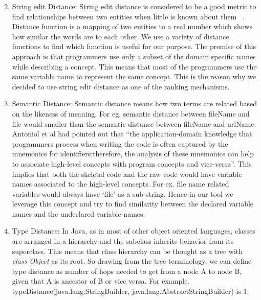 \begin{enumerate}
\setcounter{enumi}{1}
\item String edit Distance: String edit distance is considered to be a good metric to find relationships between two entities when little is known about them ~\cite{cohen2003comparison}. Distance function is a mapping of two entities to a real number which shows how similar the words are to each other. We use a variety of distance functions to find which function is useful for our purpose. The premise of this approach is that programmers use only a subset of the domain specific names while describing a concept. This means that most of the programmers use the same variable name to represent the same concept. This is the reason why we decided to use string edit distance as one of the ranking mechanisms.
\item Semantic Distance:  Semantic distance means how two terms are related based on the likeness of meaning. For eg. semantic distance between fileName and file would smaller than the semantic distance between fileName and urlName.  Antoniol et al had pointed out that ``the application-domain knowledge that programmers process when writing the code is often captured by the mnemonics for identifiers;therefore, the analysis of these mnemonics can help to associate high-level concepts with program concepts and vice-versa''. This implies that both the skeletal code and the raw code would have variable names associated to the high-level concepts. For ex. file name related variables would always have `file' as a sub-string. Hence in our tool we leverage this concept and try to find similarity between the declared variable names and the undeclared variable names. 

\item Type Distance:  In Java, as in most of other object oriented languages, classes are arranged in a hierarchy and the subclass inherits behavior from its superclass. This means that class hierarchy can be thought as a tree with \textit{class Object} as its root. So drawing from the tree terminology, we can define type distance as number of hops needed to get from a node A to node B, given that A is ancestor of B or vice versa. For example. typeDistance(java.lang.StringBuilder, java.lang.AbstractStringBuilder) is 1. 
\end{enumerate}


